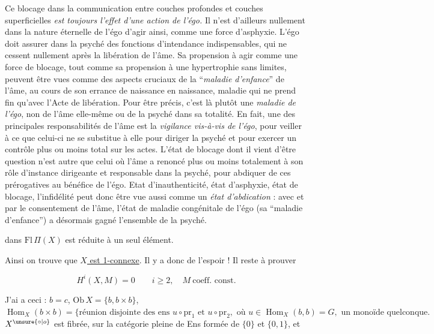 Ce blocage dans la communication entre couches profondes et couches superficielles \textit{est toujours l'effet d'une action de l'égo.} Il n'est d'ailleurs nullement dans la nature éternelle de l'égo d'agir ainsi, comme une force d'asphyxie. L'égo doit assurer dans la psyché des fonctions d'intendance indispensables, qui ne cessent nullement après la libération de l'âme. Sa propension à agir comme une force de blocage, tout comme sa propension à une hypertrophie sans limites, peuvent être vues comme des aspects cruciaux de la ``\textit{maladie d'enfance}'' de l'âme, au cours de son errance de naissance en naissance, maladie qui ne prend fin qu'avec l'Acte de libération. Pour être précis, c'est là plutôt une \textit{maladie de l'égo}, non de l'âme elle-même ou de la psyché dans sa totalité. En fait, une des principales responsabilités de l'âme est la \textit{vigilance vis-à-vis de l'égo}, pour veiller à ce que celui-ci ne se substitue à elle pour diriger la psyché et pour exercer un contrôle plus ou moins total sur les actes. L'état de blocage dont il vient d'être question n'est autre que celui où l'âme a renoncé plus ou moins totalement à son rôle d'instance dirigeante et responsable dans la psyché, pour abdiquer de ces prérogatives au bénéfice de l'égo. Etat d'inauthenticité, état d'asphyxie, état de blocage, l'infidélité peut donc être vue aussi comme un \textit{état d'abdication} : avec et par le consentement de l'âme, l'état de maladie congénitale de l'égo (sa ``maladie d'enfance'') a désormais gagné l'ensemble de la psyché.


dans  $\mathrm{Fl}\,\Pi(X)$ est réduite à un seul élément.

Ainsi on trouve que \uline{$X$ est 1-connexe}. Il y a donc de l'espoir ! Il reste à prouver

\[
 H^i(X,M)=0 \qquad i\geq 2,\quad M\ \text{coeff. const.}
\]

J'ai   a ceci : $b=c$, $\mathrm{Ob}\,X=\{b,b\times b\}$, $\operatorname{Hom}_X(b\times b)=\{\text{réunion disjointe des ens }u\circ\mathrm{pr}_1\text{ et }u\circ\mathrm{pr}_2,\text{ où }u\in\operatorname{Hom}_X(b,b)=G,\text{ un monoïde quelconque.}$    $X^{\unsure{\circ|o}}$ est  fibrée,  sur la  catégorie pleine  de Ens formée de $\{0\}$ et $\{0,1\}$, et

